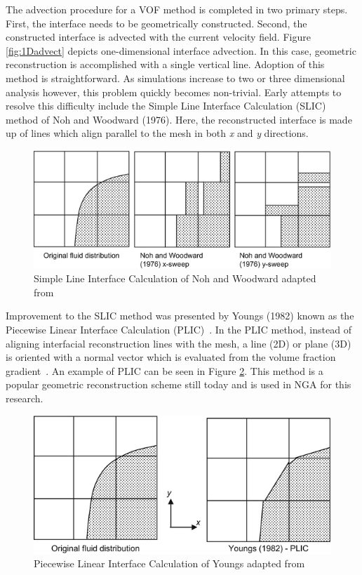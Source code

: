 The advection procedure for a VOF method is completed in two primary steps. First, the interface needs to be geometrically constructed. Second, the constructed interface is advected with the current velocity field\cite{TRYG}. Figure \ref{fig:1Dadvect} depicts one-dimensional interface advection. In this case, geometric reconstruction is accomplished with a single vertical line. Adoption of this method is straightforward. As simulations increase to two or three dimensional analysis however, this problem quickly becomes non-trivial. Early attempts to resolve this difficulty include the Simple Line Interface Calculation (SLIC) method of Noh and Woodward (1976)\cite{nohwoodward}. Here, the reconstructed interface is made up of lines which align parallel to the mesh in both \textit{x} and \textit{y} directions.           
\begin{figure}[htbp]
	\centering
	\includegraphics[width=1.0\textwidth]{figs/SLIC.png}
	\caption{Simple Line Interface Calculation of Noh and Woodward adapted from~\cite{SLICfig}}
	\label{fig:SLIC}
\end{figure}
Improvement to the SLIC method was presented by Youngs (1982)  known as the Piecewise Linear Interface Calculation (PLIC)~\cite{youngs}. In the PLIC method, instead of aligning interfacial reconstruction lines with the mesh, a line (2D) or plane (3D) is oriented with a normal vector which is evaluated from the volume fraction gradient~\cite{yeoh}. An example of PLIC can be seen in Figure \ref{fig:PLIC}. This method is a popular geometric reconstruction scheme still today and is used in NGA for this research.

\begin{figure}[htbp]
	\centering
	\includegraphics[width=1.0\textwidth]{figs/PLIC.png}
	\caption{Piecewise Linear Interface Calculation of Youngs adapted from~\cite{yeoh}}
	\label{fig:PLIC}
\end{figure}

